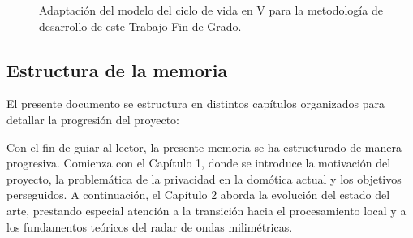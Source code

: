     \begin{figure}[htbp]
    \centering
    \caption{Adaptación del modelo del ciclo de vida en V para la metodología de desarrollo de este Trabajo Fin de Grado.}
    \label{fig:ciclo_v}
\end{figure}

\subsection{Estructura de la memoria}
El presente documento se estructura en distintos capítulos organizados para detallar la progresión del proyecto:

Con el fin de guiar al lector, la presente memoria se ha estructurado de manera progresiva. Comienza con el Capítulo 1, donde se introduce la motivación del proyecto, la problemática de la privacidad en la domótica actual y los objetivos perseguidos. A continuación, el Capítulo 2 aborda la evolución del estado del arte, prestando especial atención a la transición hacia el procesamiento local y a los fundamentos teóricos del radar de ondas milimétricas. 

